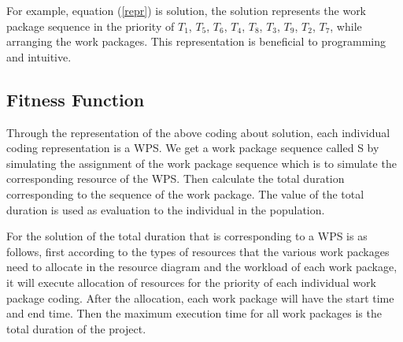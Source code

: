 For example, equation (\ref{repr}) is solution, the solution represents the work
package sequence in the priority of $T_1$, $T_5$, $T_6$, $T_4$, $T_8$, $T_3$,
$T_9$, $T_2$, $T_7$, while arranging the work packages. This representation is
beneficial to programming and intuitive.


\subsection{Fitness Function}
%
Through the representation of the above coding about solution, each individual
coding representation is a WPS. We get a work package sequence called S by
simulating the assignment of the work package sequence which is to simulate the
corresponding resource of the WPS. Then calculate the total duration
corresponding to the sequence of the work package. The value of the total
duration is used as evaluation to the individual in the population.

For the solution of the total duration that is corresponding to a WPS is as
follows, first according to the types of resources that the various work
packages need to allocate in the resource diagram and the workload of each work
package, it will execute allocation of resources for the priority of each
individual work package coding. After the allocation, each work package will
have the start time and end time. Then the maximum execution time for all work
packages is the total duration of the project.

